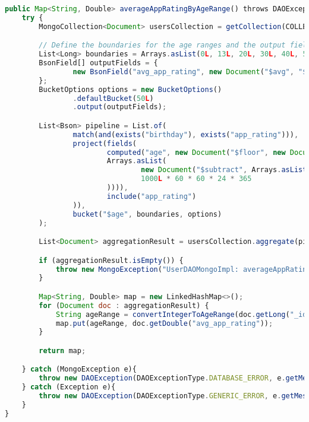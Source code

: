 \begin{lstlisting}[language=JavaScript]
public Map<String, Double> averageAppRatingByAgeRange() throws DAOException {
    try {
        MongoCollection<Document> usersCollection = getCollection(COLLECTION_NAME);

        // Define the boundaries for the age ranges and the output fields
        List<Long> boundaries = Arrays.asList(0L, 13L, 20L, 30L, 40L, 50L);
        BsonField[] outputFields = {
                new BsonField("avg_app_rating", new Document("$avg", "$app_rating"))
        };
        BucketOptions options = new BucketOptions()
                .defaultBucket(50L)
                .output(outputFields);

        List<Bson> pipeline = List.of(
                match(and(exists("birthday"), exists("app_rating"))),
                project(fields(
                        computed("age", new Document("$floor", new Document("$divide",
                        Arrays.asList(
                                new Document("$subtract", Arrays.asList(new Date(), "$birthday")),
                                1000L * 60 * 60 * 24 * 365
                        )))),
                        include("app_rating")
                )),
                bucket("$age", boundaries, options)
        );

        List<Document> aggregationResult = usersCollection.aggregate(pipeline).into(new ArrayList<>());

        if (aggregationResult.isEmpty()) {
            throw new MongoException("UserDAOMongoImpl: averageAppRatingByAgeRange: No data found");
        }

        Map<String, Double> map = new LinkedHashMap<>();
        for (Document doc : aggregationResult) {
            String ageRange = convertIntegerToAgeRange(doc.getLong("_id"));
            map.put(ageRange, doc.getDouble("avg_app_rating"));
        }

        return map;

    } catch (MongoException e){
        throw new DAOException(DAOExceptionType.DATABASE_ERROR, e.getMessage());
    } catch (Exception e){
        throw new DAOException(DAOExceptionType.GENERIC_ERROR, e.getMessage());
    }
}
\end{lstlisting}
    
